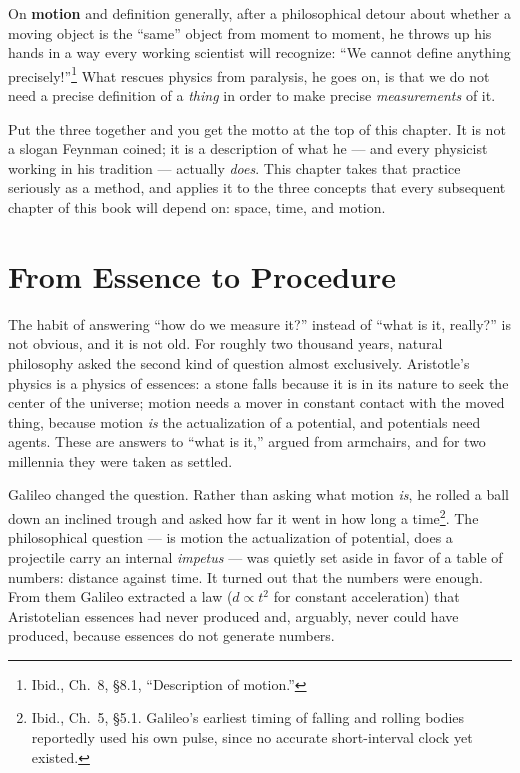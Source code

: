 \documentclass[12pt]{book}
\begin{document}
On \textbf{motion} and definition generally, after a philosophical detour about whether a moving object is the ``same'' object from moment to moment, he throws up his hands in a way every working scientist will recognize: ``We cannot define anything precisely!''\footnote{Ibid., Ch.~8, \S8.1, ``Description of motion.''} What rescues physics from paralysis, he goes on, is that we do not need a precise definition of a \emph{thing} in order to make precise \emph{measurements} of it.

Put the three together and you get the motto at the top of this chapter. It is not a slogan Feynman coined; it is a description of what he --- and every physicist working in his tradition --- actually \emph{does}. This chapter takes that practice seriously as a method, and applies it to the three concepts that every subsequent chapter of this book will depend on: space, time, and motion.

\section{From Essence to Procedure}
\label{sec:operationalism}

The habit of answering ``how do we measure it?'' instead of ``what is it, really?'' is not obvious, and it is not old. For roughly two thousand years, natural philosophy asked the second kind of question almost exclusively. Aristotle's physics is a physics of essences: a stone falls because it is in its nature to seek the center of the universe; motion needs a mover in constant contact with the moved thing, because motion \emph{is} the actualization of a potential, and potentials need agents. These are answers to ``what is it,'' argued from armchairs, and for two millennia they were taken as settled.

Galileo changed the question. Rather than asking what motion \emph{is}, he rolled a ball down an inclined trough and asked how far it went in how long a time\footnote{Ibid., Ch.~5, \S5.1. Galileo's earliest timing of falling and rolling bodies reportedly used his own pulse, since no accurate short-interval clock yet existed.}. The philosophical question --- is motion the actualization of potential, does a projectile carry an internal \emph{impetus} --- was quietly set aside in favor of a table of numbers: distance against time. It turned out that the numbers were enough. From them Galileo extracted a law ($d \propto t^2$ for constant acceleration) that Aristotelian essences had never produced and, arguably, never could have produced, because essences do not generate numbers.
\end{document}
